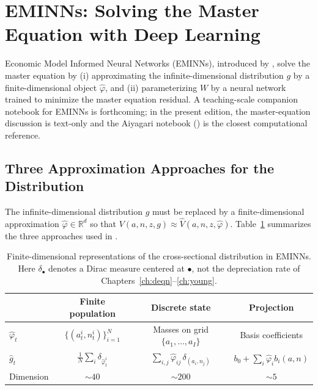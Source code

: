 \documentclass[11pt,a4paper]{report}
\newcommand{\R}{\mathbb{R}}
\begin{document}
\section{EMINNs: Solving the Master Equation with Deep Learning}
\label{sec:eminn}

Economic Model Informed Neural Networks (EMINNs), introduced by \citet{gu2024masterequations}, solve the master equation by (i) approximating the infinite-dimensional distribution $g$ by a finite-dimensional object $\hat{\varphi}$, and (ii) parameterizing $W$ by a neural network trained to minimize the master equation residual.  A teaching-scale companion notebook for EMINNs is forthcoming; in the present edition, the master-equation discussion is text-only and the Aiyagari notebook () is the closest computational reference.

\subsection{Three Approximation Approaches for the Distribution}

The infinite-dimensional distribution $g$ must be replaced by a finite-dimensional approximation $\hat{\varphi} \in \R^d$ so that $V(a,n,z,g) \approx \hat{V}(a,n,z,\hat{\varphi})$.  Table~\ref{tab:eminn_distribution_approximations} summarizes the three approaches used in \citet{gu2024masterequations}.

\begin{table}[ht]
\centering
\small
\renewcommand{\arraystretch}{1.2}
\begin{tabular}{lccc}
\toprule
& \textbf{Finite population} & \textbf{Discrete state} & \textbf{Projection} \\
\midrule
$\hat{\varphi}_t$ & $\{(a_t^i, n_t^i)\}_{i=1}^N$ & Masses on grid $\{a_1,\ldots,a_I\}$ & Basis coefficients \\
$\hat{g}_t$ & $\frac{1}{N}\sum_i \delta_{\hat{\varphi}_t^i}$ & $\sum_{i,j} \hat{\varphi}_{ij}\,\delta_{(a_i,n_j)}$ & $b_0 + \sum_i \hat{\varphi}_i b_i(a,n)$ \\
Dimension & $\sim 40$ & $\sim 200$ & $\sim 5$ \\
\bottomrule
\end{tabular}
\caption{Finite-dimensional representations of the cross-sectional distribution in EMINNs.  Here $\delta_{\bullet}$ denotes a Dirac measure centered at $\bullet$, not the depreciation rate of Chapters~\ref{ch:deqn}--\ref{ch:young}.}
\label{tab:eminn_distribution_approximations}
\end{table}
\end{document}
